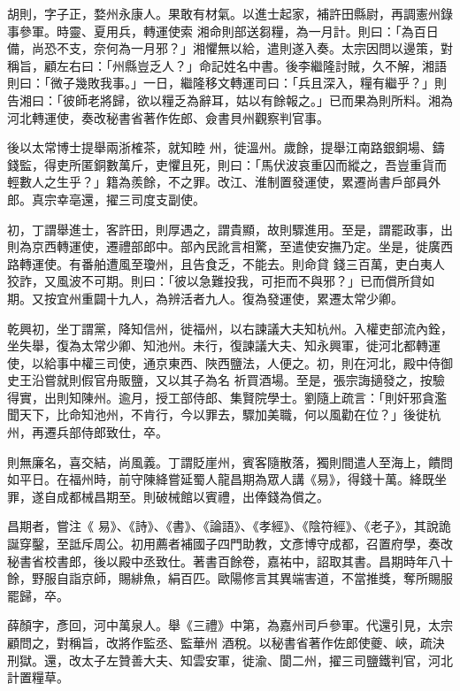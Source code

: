\begin{pinyinscope}
 胡則，字子正，婺州永康人。果敢有材氣。以進士起家，補許田縣尉，再調憲州錄事參軍。時靈、夏用兵，轉運使索
 湘命則部送芻糧，為一月計。則曰：「為百日備，尚恐不支，奈何為一月邪？」湘懼無以給，遣則遂入奏。太宗因問以邊策，對稱旨，顧左右曰：「州縣豈乏人？」命記姓名中書。後李繼隆討賊，久不解，湘語則曰：「微子幾敗我事。」一日，繼隆移文轉運司曰：「兵且深入，糧有繼乎？」則告湘曰：「彼師老將歸，欲以糧乏為辭耳，姑以有餘報之。」已而果為則所料。湘為河北轉運使，奏改秘書省著作佐郎、僉書貝州觀察判官事。



 後以太常博士提舉兩浙榷茶，就知睦
 州，徙溫州。歲餘，提舉江南路銀銅場、鑄錢監，得吏所匿銅數萬斤，吏懼且死，則曰：「馬伏波哀重囚而縱之，吾豈重貨而輕數人之生乎？」籍為羨餘，不之罪。改江、淮制置發運使，累遷尚書戶部員外郎。真宗幸亳還，擢三司度支副使。



 初，丁謂舉進士，客許田，則厚遇之，謂貴顯，故則驟進用。至是，謂罷政事，出則為京西轉運使，遷禮部郎中。部內民訛言相驚，至遣使安撫乃定。坐是，徙廣西路轉運使。有番舶遭風至瓊州，且告食乏，不能去。則命貸
 錢三百萬，吏白夷人狡詐，又風波不可期。則曰：「彼以急難投我，可拒而不與邪？」已而償所貸如期。又按宜州重闢十九人，為辨活者九人。復為發運使，累遷太常少卿。



 乾興初，坐丁謂黨，降知信州，徙福州，以右諫議大夫知杭州。入權吏部流內銓，坐失舉，復為太常少卿、知池州。未行，復諫議大夫、知永興軍，徙河北都轉運使，以給事中權三司使，通京東西、陜西鹽法，人便之。初，則在河北，殿中侍御史王沿嘗就則假官舟販鹽，又以其子為名
 祈買酒場。至是，張宗誨擿發之，按驗得實，出則知陳州。逾月，授工部侍郎、集賢院學士。劉隨上疏言：「則奸邪貪濫聞天下，比命知池州，不肯行，今以罪去，驟加美職，何以風勸在位？」後徙杭州，再遷兵部侍郎致仕，卒。



 則無廉名，喜交結，尚風義。丁謂貶崖州，賓客隨散落，獨則間遣人至海上，饋問如平日。在福州時，前守陳絳嘗延蜀人龍昌期為眾人講《易》，得錢十萬。絳既坐罪，遂自成都械昌期至。則破械館以賓禮，出俸錢為償之。



 昌期者，嘗注《
 易》、《詩》、《書》、《論語》、《孝經》、《陰符經》、《老子》，其說詭誕穿鑿，至詆斥周公。初用薦者補國子四門助教，文彥博守成都，召置府學，奏改秘書省校書郎，後以殿中丞致仕。著書百餘卷，嘉祐中，詔取其書。昌期時年八十餘，野服自詣京師，賜緋魚，絹百匹。歐陽修言其異端害道，不當推獎，奪所賜服罷歸，卒。



 薛顏字，彥回，河中萬泉人。舉《三禮》中第，為嘉州司戶參軍。代還引見，太宗顧問之，對稱旨，改將作監丞、監華州
 酒稅。以秘書省著作佐郎使夔、峽，疏決刑獄。還，改太子左贊善大夫、知雲安軍，徙渝、閬二州，擢三司鹽鐵判官，河北計置糧草。




\end{pinyinscope}
